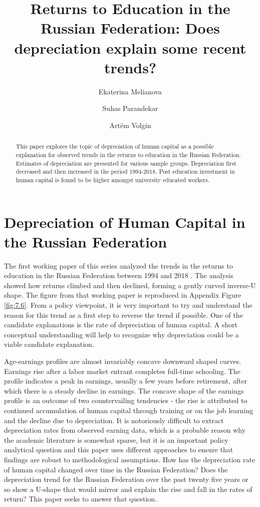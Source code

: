 \documentclass[alpha-refs]{wiley-article-02b}
\title{Returns to Education in the Russian Federation: Does depreciation explain some recent trends?}
\author[*]{Ekaterina Melianova}
\author[*]{\hspace{-1em}Suhas Parandekar}
\author[*]{\hspace{-1em}Art\"{e}m Volgin}
\affil[*]{Education Global Practice, Europe and Central Asia}
\begin{document}
\maketitle

\begin{abstract}
This paper explores the topic of depreciation of human capital as a possible explanation for observed trends in the returns to education in the Russian Federation. Estimates of depreciation are presented for various sample groups. Depreciation first decreased and then increased in the period 1994-2018. Post education investment in human capital is found to be higher amongst university educated workers. 
\end{abstract}


\section{Depreciation of Human Capital in the Russian Federation}

The first working paper of this series analyzed the trends in the returns 
to education in the Russian Federation between 1994 and 2018 
\parencite{Patrinos_2020}. The analysis showed how returns climbed and then 
declined, forming a gently curved inverse-U shape. The figure from that 
working paper is reproduced in Appendix Figure \ref{fig:7.6}. From a policy 
viewpoint, it is very important to try and understand the reason for this 
trend as a first step to reverse the trend if possible. One of the 
candidate explanations is the rate of depreciation of human capital. A 
short conceptual understanding will help to recognize why depreciation 
could be a viable candidate explanation. 

Age-earnings profiles are almost invariably concave downward shaped curves. 
Earnings rise after a labor market entrant completes full-time schooling. 
The profile indicates a peak in earnings, usually a few years before 
retirement, after which there is a steady decline in earnings. The concave 
shape of the earnings profile is an outcome of two countervailing 
tendencies - the rise is attributed to continued accumulation of human 
capital through training or on the job learning and the decline due to 
depreciation. It is notoriously difficult to extract depreciation rates 
from observed earning data, which is a probable reason why the academic 
literature is somewhat sparse, but it is an important policy analytical 
question and this paper uses different approaches to ensure that findings 
are robust to methodological assumptions. How has the depreciation rate of 
human capital changed over time in the Russian Federation? Does the 
depreciation trend for the Russian Federation over the past twenty five 
years or so show a U-shape that would mirror and explain the rise and fall 
in the rates of return? This paper seeks to answer that question. 
\end{document}
